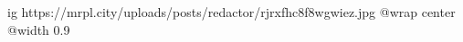 
 
 
 
 

\ifcmt
  ig https://mrpl.city/uploads/posts/redactor/rjrxfhc8f8wgwiez.jpg
  @wrap center
  @width 0.9
\fi
